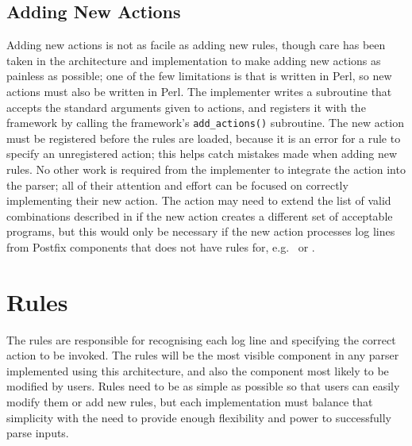 \subsection{Adding New Actions}

\label{adding new actions in implementation}

Adding new actions is not as facile as adding new rules, though care has
been taken in the architecture and implementation to make adding new
actions as painless as possible; one of the few limitations is that
\parsername{} is written in Perl, so new actions must also be written in
Perl.  The implementer writes a subroutine that accepts the standard
arguments given to actions, and registers it with the framework by calling
the framework's \texttt{add\_actions()} subroutine.  The new action must be
registered before the rules are loaded, because it is an error for a rule
to specify an unregistered action; this helps catch mistakes made when
adding new rules.  No other work is required from the implementer to
integrate the action into the parser; all of their attention and effort can
be focused on correctly implementing their new action.  The action may need
to extend the list of valid combinations described in  if the new action creates a different set of acceptable
programs, but this would only be necessary if the new action processes log
lines from Postfix components that \parsername{} does not have rules for,
e.g.\  or .

\section{Rules}

\label{rules in implementation}

The rules are responsible for recognising each log line and specifying the
correct action to be invoked.  The rules will be the most visible component
in any parser implemented using this architecture, and also the component
most likely to be modified by users.  Rules need to be as simple as
possible so that users can easily modify them or add new rules, but each
implementation must balance that simplicity with the need to provide enough
flexibility and power to successfully parse inputs.

